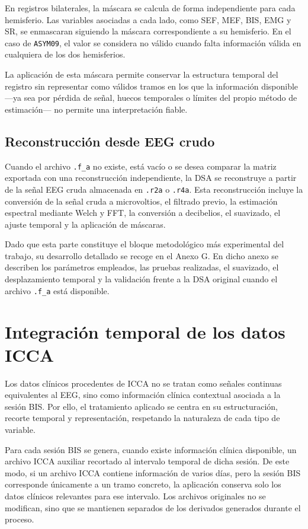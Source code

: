 \documentclass[
  spanish,
  a4paper,
  12pt,
  twoside]{memoir}
\begin{document}
En registros bilaterales, la máscara se calcula de forma independiente
para cada hemisferio. Las variables asociadas a cada lado, como SEF,
MEF, BIS, EMG y SR, se enmascaran siguiendo la máscara correspondiente a
su hemisferio. En el caso de \texttt{ASYM09}, el valor se considera no
válido cuando falta información válida en cualquiera de los dos
hemisferios.

La aplicación de esta máscara permite conservar la estructura temporal
del registro sin representar como válidos tramos en los que la
información disponible ---ya sea por pérdida de señal, huecos temporales
o límites del propio método de estimación--- no permite una
interpretación fiable.

\subsection{Reconstrucción desde EEG
crudo}\label{reconstrucciuxf3n-desde-eeg-crudo}

Cuando el archivo \texttt{.f\_a} no existe, está vacío o se desea
comparar la matriz exportada con una reconstrucción independiente, la
DSA se reconstruye a partir de la señal EEG cruda almacenada en
\texttt{.r2a} o \texttt{.r4a}. Esta reconstrucción incluye la conversión
de la señal cruda a microvoltios, el filtrado previo, la estimación
espectral mediante Welch y FFT, la conversión a decibelios, el
suavizado, el ajuste temporal y la aplicación de máscaras.

Dado que esta parte constituye el bloque metodológico más experimental
del trabajo, su desarrollo detallado se recoge en el Anexo G. En dicho
anexo se describen los parámetros empleados, las pruebas realizadas, el
suavizado, el desplazamiento temporal y la validación frente a la DSA
original cuando el archivo \texttt{.f\_a} está disponible.

\section{Integración temporal de los datos
ICCA}\label{integraciuxf3n-temporal-de-los-datos-icca}

Los datos clínicos procedentes de ICCA no se tratan como señales
continuas equivalentes al EEG, sino como información clínica contextual
asociada a la sesión BIS. Por ello, el tratamiento aplicado se centra en
su estructuración, recorte temporal y representación, respetando la
naturaleza de cada tipo de variable.

Para cada sesión BIS se genera, cuando existe información clínica
disponible, un archivo ICCA auxiliar recortado al intervalo temporal de
dicha sesión. De este modo, si un archivo ICCA contiene información de
varios días, pero la sesión BIS corresponde únicamente a un tramo
concreto, la aplicación conserva solo los datos clínicos relevantes para
ese intervalo. Los archivos originales no se modifican, sino que se
mantienen separados de los derivados generados durante el proceso.
\end{document}
